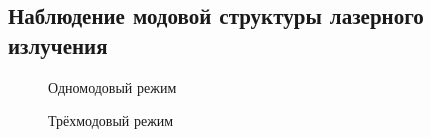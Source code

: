 \documentclass[a4paper,12pt]{article}
\theoremstyle{definition}
\begin{document}
\subsection{Наблюдение модовой структуры лазерного излучения}

\begin{figure}[H]
	\begin{minipage}[h]{0.5\linewidth}
		\caption{Одномодовый режим}
	\end{minipage}
	\begin{minipage}[h]{0.5\linewidth}
		\caption{Трёхмодовый режим}
	\end{minipage}
\end{figure}
\end{document}
